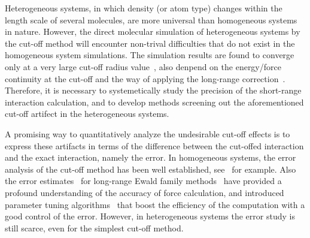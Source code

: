 \documentclass[aps,pre,preprint]{revtex4-1}
\begin{document}
Heterogeneous systems, in which density (or atom type) changes within
the length scale of several molecules, are more universal than
homogeneous systems in nature. However, the direct molecular
simulation of heterogeneous systems by the cut-off method will
encounter non-trival difficulties that do not exist in the homogeneous
system simulations.  The simulation results are found to converge only
at a very large cut-off radius value~\cite{duque2004some,
  ismail2007application}, also denpend on the energy/force continuity
at the cut-off and the way of applying the long-range
correction~\cite{trokhymchuk1999computer, guo1997long,
  mecke1997molecular, janecek2006long, goujon2004monte,
  shen2007comparative}.  Therefore, it is necessary to systemetically
study the precision of the short-range interaction calculation, and to
develop methods screening out the aforementioned cut-off artifect in
the heterogeneous systems.



A promising way to quantitatively analyze the undesirable cut-off
effects is to express these artifacts in terms of the difference
between the cut-offed interaction and the exact interaction, namely
the error. In homogeneous systems, the error analysis of the cut-off
method has been well established, see~\cite{kolafa1992cutoff} for
example. Also the error estimates~\cite{hummer1995numerical,
  kolafa1992cutoff, petersen1995accuracy, deserno1998mue2,
  wang2010optimizing} for long-range Ewald family
methods~\cite{ewald1921die, hockney1988computer, deserno1998mue1,
  darden1993pme, essmann1995spm} have provided a profound
understanding of the accuracy of force calculation, and introduced
parameter tuning algorithms~\cite{limbach06a, wang2010optimizing} that
boost the efficiency of the computation with a good control of the
error. However, in heterogeneous systems the error study is still
scarce, even for the simplest cut-off method.
\end{document}
